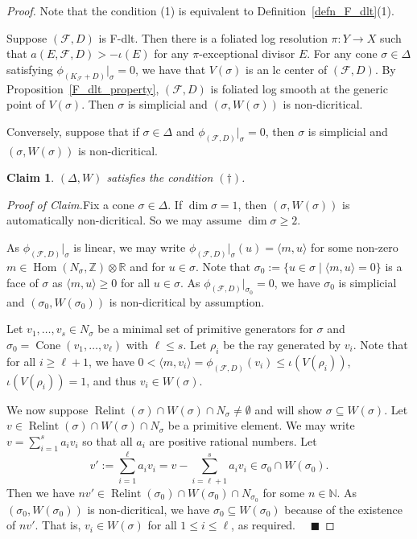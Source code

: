 \documentclass[12pt,reqno]{amsart}
\newtheorem*{claim}{Claim}
\theoremstyle{definition}
\newcommand{\on}{\operatorname}
\newenvironment{claimproof}[1]{\par\noindent\emph{Proof of Claim.}\space#1}{}
\newcommand\cF{{\mathcal{F}}}
\newcommand\bN{{\mathbb N}}
\newcommand\bR{{\mathbb R}}
\newcommand\bZ{{\mathbb Z}}
\begin{document}
\begin{proof}
    Note that the condition (1) is equivalent to Definition~\ref{defn_F_dlt}(1). 

    Suppose $(\cF,D)$ is F-dlt. 
    Then there is a foliated log resolution $\pi\colon Y\to X$ such that $a(E,\cF,D)>-\iota(E)$ for any $\pi$-exceptional divisor $E$. 
    For any cone $\sigma\in\Delta$ satisfying $\phi_{(K_{\cF}+D)}\vert_\sigma=0$, we have that $V(\sigma)$ is an lc center of $(\cF,D)$. 
    By Proposition~\ref{F_dlt_property}, $(\cF,D)$ is foliated log smooth at the generic point of $V(\sigma)$. 
    Then $\sigma$ is simplicial and $(\sigma,W(\sigma))$ is non-dicritical. 

    Conversely, suppose that if $\sigma\in\Delta$ and $\phi_{(\cF,D)}\vert_\sigma=0$, then $\sigma$ is simplicial and $(\sigma,W(\sigma))$ is non-dicritical. 
    \begin{claim}
        $(\Delta,W)$ satisfies the condition $(\dagger)$.
    \end{claim}
    \begin{claimproof}
    Fix a cone $\sigma\in\Delta$. 
    If $\dim\sigma=1$, then $(\sigma,W(\sigma))$ is automatically non-dicritical. 
    So we may assume $\dim\sigma\geq 2$. 
    
    As $\phi_{(\cF,D)}\vert_\sigma$ is linear, we may write $\phi_{(\cF,D)}\vert_\sigma(u) = \langle m, u\rangle$ for some non-zero $m\in \on{Hom}(N_\sigma,\bZ)\otimes\bR$ and for $u\in \sigma$. 
    Note that $\sigma_0:=\{u\in\sigma\mid\langle m,u\rangle=0\}$ is a face of $\sigma$ as $\langle m,u\rangle\geq 0$ for all $u\in\sigma$. 
    As $\phi_{(\cF,D)}\vert_{\sigma_0}=0$, we have $\sigma_0$ is simplicial and $(\sigma_0,W(\sigma_0))$ is non-dicritical by assumption. 
    
    Let $v_1,\ldots,v_s\in N_\sigma$ be a minimal set of primitive generators for $\sigma$ and $\sigma_0=\on{Cone}(v_1,\ldots,v_\ell)$ with $\ell\leq s$. 
    Let $\rho_i$ be the ray generated by $v_i$. 
    Note that for all $i\geq \ell+1$, we have $0<\langle m,v_i\rangle = \phi_{(\cF,D)}(v_i)\leq \iota(V(\rho_i))$, $\iota(V(\rho_i))=1$, and thus $v_i\in W(\sigma)$. 

    We now suppose $\on{Relint}(\sigma)\cap W(\sigma)\cap N_\sigma\neq\emptyset$ and will show $\sigma\subseteq W(\sigma)$.  Let $v\in\on{Relint}(\sigma)\cap W(\sigma)\cap N_\sigma$ be a primitive element. 
    We may write $v=\sum_{i=1}^s a_iv_i$ so that all $a_i$ are positive rational numbers. 
    Let \[v':=\sum_{i=1}^{\ell} a_iv_i = v-\sum_{i=\ell+1}^s a_iv_i\in\sigma_0\cap W(\sigma_0).\] 
    Then we have $nv'\in\on{Relint}(\sigma_0)\cap W(\sigma_0)\cap N_{\sigma_0}$ for some $n\in\bN$. As $(\sigma_0,W(\sigma_0))$ is non-dicritical, we have $\sigma_0\subseteq W(\sigma_0)$ because of the existence of $nv'$. That is, $v_i\in W(\sigma)$ for all $1\leq i\leq \ell$, as required. $\quad\blacksquare$
    \end{claimproof}
    

\end{proof}
\end{document}
